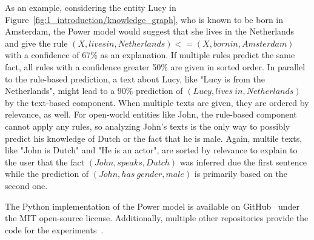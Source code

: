 As an example, considering the entity Lucy in Figure~\ref{fig:1_introduction/knowledge_graph}, who is known to be born in Amsterdam, the Power model would suggest that she lives in the Netherlands and give the rule $(X, lives in, Netherlands) <= (X, born in, Amsterdam)$ with a confidence of 67\% as an explanation. If multiple rules predict the same fact, all rules with a confidence greater 50\% are given in sorted order. In parallel to the rule-based prediction, a text about Lucy, like "Lucy is from the Netherlands", might lead to a 90\% prediction of $(Lucy, lives~in, Netherlands)$ by the text-based component. When multiple texts are given, they are ordered by relevance, as well. For open-world entities like John, the rule-based component cannot apply any rules, so analyzing John's texts is the only way to possibly predict his knowledge of Dutch or the fact that he is male. Again, multile texts, like "John is Dutch" and "He is an actor", are sorted by relevance to explain to the user that the fact $(John, speaks, Dutch)$ was inferred due the first sentence while the prediction of $(John, has~gender, male)$ is primarily based on the second one.

The Python implementation of the Power model is available on GitHub~\cite{GitHubPower} under the MIT open-source license. Additionally, multiple other repositories provide the code for the experiments~\cite{}.
